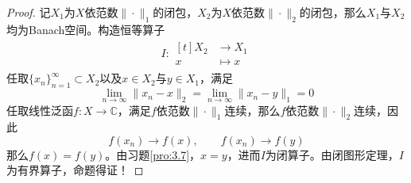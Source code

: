 \documentclass[lang = cn, scheme = chinese, 10pt]{elegantbook}
\newcommand{\C}{\mathbb{C}}  %
\newcommand{\sub}{\subset}   %
\begin{document}
\begin{proof}
	记$X_1$为$X$依范数$\|\cdot\|_1$的闭包，$X_2$为$X$依范数$\|\cdot\|_2$的闭包，那么$X_1$与$X_2$均为Banach空间。构造恒等算子
	\begin{align*}
		I:\begin{aligned}[t]
			X_2 &\longrightarrow X_1\\
			x &\longmapsto x
		\end{aligned}
	\end{align*}
	任取$\{x_n\}_{n=1}^{\infty}\sub X_2$以及$x\in X_2$与$y\in X_1$，满足
	$$
	\lim_{n\to\infty}\|x_n-x\|_2
	=\lim_{n\to\infty}\|x_n-y\|_1
	=0
	$$
	任取线性泛函$f:X\to\C$，满足$f$依范数$\|\cdot\|_1$连续，那么$f$依范数$\|\cdot\|_2$连续，因此
	$$
	f(x_n)\to f(x),\qquad 
	f(x_n)\to f(y)
	$$
	那么$f(x)=f(y)$。由习题\ref{pro:3.7}，$x=y$，进而$I$为闭算子。由闭图形定理，$I$为有界算子，命题得证！
\end{proof}
\end{document}
